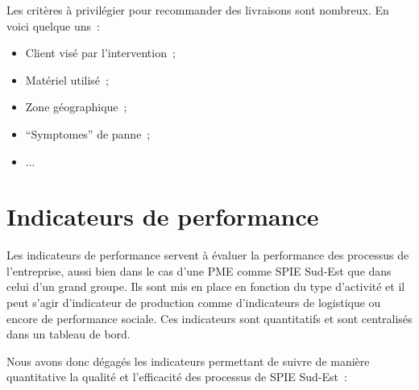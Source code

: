             Les critères à privilégier pour recommander des livraisons sont nombreux. En voici quelque uns~:
            \begin{itemize}
                \item Client visé par l'intervention~;
                \item Matériel utilisé~;
                \item Zone géographique~;
                \item ``Symptomes'' de panne~;
                \item ...
            \end{itemize}

\section{Indicateurs de performance}

    Les indicateurs de performance servent à évaluer la performance des processus de l'entreprise, aussi bien dans le cas d'une PME comme SPIE Sud-Est que dans celui d'un grand groupe. Ils sont mis en place en fonction du type d'activité et il peut s'agir d'indicateur de production comme d'indicateurs de logistique ou encore de performance sociale. Ces indicateurs sont quantitatifs et sont centralisés dans un tableau de bord.

    Nous avons donc dégagés les indicateurs permettant de suivre de manière quantitative la qualité et l'efficacité des processus de SPIE Sud-Est~:

